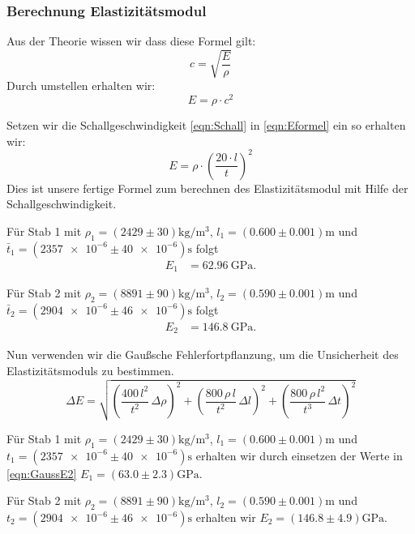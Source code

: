 \subsubsection{Berechnung Elastizitätsmodul}

Aus der Theorie wissen wir dass diese Formel gilt: 
\begin{equation}
  c = \sqrt{\frac{E}{\rho}}
\end{equation}
Durch umstellen erhalten wir: 
\begin{equation}
  E = \rho \cdot c^2
  \label{eqn:Eformel}
\end{equation}

Setzen wir die Schallgeschwindigkeit \ref{eqn:Schall} in \ref{eqn:Eformel} ein so erhalten wir: 
\begin{equation}
  E = \rho \cdot \left( \frac{20 \cdot l}{t} \right)^2
  \label{eqn:Eformel2}
\end{equation}
Dies ist unsere fertige Formel zum berechnen des Elastizitätsmodul mit Hilfe der Schallgeschwindigkeit.

Für Stab 1 mit $\rho_1 = \left( \num{2429} \pm \num{30} \right) \unit{\kilo\gram\per\meter\cubed}$, $l_1 = \left( \num{0.600} \pm \num{0.001} \right) \unit{\meter}$ und $\bar t_1 = \left( \num{2357e-6} \pm \num{40e-6} \right) \unit{\second}$ folgt
\begin{align}
  E_1  &= \qty{62.96}{\giga\pascal}.
\end{align}

Für Stab 2 mit $\rho_2 = \left( \num{8891} \pm \num{90} \right) \unit{\kilo\gram\per\meter\cubed}$, $l_2 = \left( \num{0.590} \pm \num{0.001} \right) \unit{\meter}$ und $\bar t_2 = \left( \num{2904e-6} \pm \num{46e-6} \right) \unit{\second}$ folgt
\begin{align}
  E_2  &= \qty{146.8}{\giga\pascal}.
\end{align}

Nun verwenden wir die Gaußsche Fehlerfortpflanzung, um die Unsicherheit des Elastizitätsmoduls zu bestimmen.
\begin{equation}
  \Delta E = \sqrt{
    \left( \frac{400\,l^2}{t^2} \, \Delta\rho \right)^2 +
    \left( \frac{800\,\rho\,l}{t^2} \, \Delta l \right)^2 +
    \left( \frac{800\,\rho\,l^2}{t^3} \, \Delta t \right)^2
  }
  \label{eqn:GaussE2}
\end{equation}

Für Stab 1 mit $\rho_1 = \left( \num{2429} \pm \num{30} \right) \unit{\kilo\gram\per\meter\cubed}$, $l_1 = \left( \num{0.600} \pm \num{0.001} \right) \unit{\meter}$ und $t_1 = \left( \num{2357e-6} \pm \num{40e-6} \right) \unit{\second}$ erhalten wir durch einsetzen der Werte in \ref{eqn:GaussE2}
$E_1 = \left( \num{63.0} \pm \num{2.3} \right) \unit{\giga\pascal}$.

Für Stab 2 mit $\rho_2 = \left( \num{8891} \pm \num{90} \right) \unit{\kilo\gram\per\meter\cubed}$, $l_2 = \left( \num{0.590} \pm \num{0.001} \right) \unit{\meter}$ und $t_2 = \left( \num{2904e-6} \pm \num{46e-6} \right) \unit{\second}$ erhalten wir $E_2 = \left( \num{146.8} \pm \num{4.9} \right) \unit{\giga\pascal}$.
